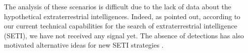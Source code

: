 \documentclass[crop]{CSLB}
\begin{document}
%
The analysis of these scenarios is difficult due to the lack of data
about the hypothetical extraterrestrial intelligences.
%
Indeed, as \citep{tarter_search_2001} pointed out, according to our
current technical capabilities for the search of extraterrestrial
intelligence (SETI), we have not received any signal yet.
%
%
The absence of detections has also motivated alternative ideas for new
SETI strategies \citep{forgan_exoplanet_2017, balbi_impact_2018,
loeb_eavesdropping_2006, maccone_KLT_2010, tarter_advancing_2009,
enriquez_breakthrough_2017, loeb_relative_2016, maccone_SETI_2011,
lingam_relative_2019, wright_theGsearch_2015, maccone_SETI_2013,
maccone_lognormals_2014, harp_application_2018,
forgan_possibility_2013, forgan_galactic_2017, funes_searching_2019}.



\Fpagebreak
\end{document}
